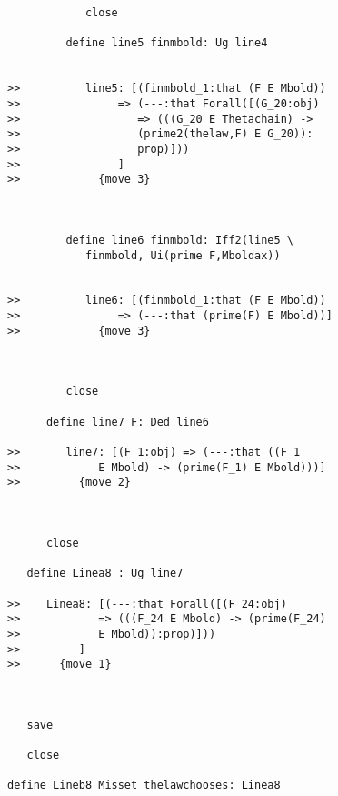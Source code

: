 \documentclass[12pt]{article}
\begin{document}
\begin{verbatim}
            close

         define line5 finmbold: Ug line4


>>          line5: [(finmbold_1:that (F E Mbold))
>>               => (---:that Forall([(G_20:obj)
>>                  => (((G_20 E Thetachain) ->
>>                  (prime2(thelaw,F) E G_20)):
>>                  prop)]))
>>               ]
>>            {move 3}



         define line6 finmbold: Iff2(line5 \
            finmbold, Ui(prime F,Mboldax))


>>          line6: [(finmbold_1:that (F E Mbold))
>>               => (---:that (prime(F) E Mbold))]
>>            {move 3}



         close

      define line7 F: Ded line6

>>       line7: [(F_1:obj) => (---:that ((F_1
>>            E Mbold) -> (prime(F_1) E Mbold)))]
>>         {move 2}



      close

   define Linea8 : Ug line7

>>    Linea8: [(---:that Forall([(F_24:obj)
>>            => (((F_24 E Mbold) -> (prime(F_24)
>>            E Mbold)):prop)]))
>>         ]
>>      {move 1}



   save

   close

define Lineb8 Misset thelawchooses: Linea8



\end{verbatim}
\end{document}
